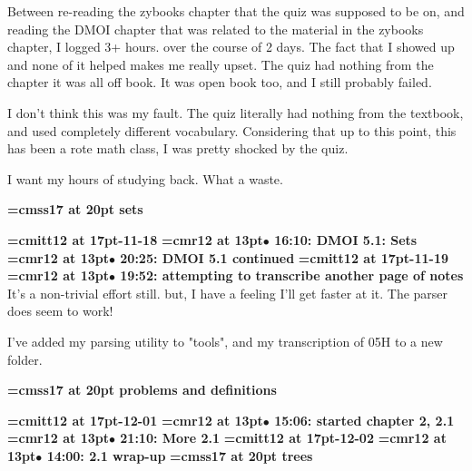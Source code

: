Between re-reading the zybooks chapter that the quiz was supposed to be on, and reading the DMOI chapter that was related to the material in the zybooks chapter, I logged 3+ hours. over the course of 2 days. The fact that I showed up and none of it helped makes me really upset. The quiz had nothing from the chapter it was all off book. It was open book too, and I still probably failed.
\par

I don't think this was my fault. The quiz literally had nothing from the textbook, and used completely different vocabulary. Considering that up to this point, this has been a rote math class, I was pretty shocked by the quiz.
\par

I want my hours of studying back. What a waste.
\par

{\medskip\noindent\bf\font\titlefont=cmss17 at 20pt sets}\medskip

{\medskip\noindent\bf\font\titlefont=cmitt12 at 17pt-11-18}\medskip
{\smallskip\noindent\bf\font\titlefont=cmr12 at 13pt\titlefont $\bullet$ 16:10: DMOI 5.1: Sets}\smallskip
{\smallskip\noindent\bf\font\titlefont=cmr12 at 13pt\titlefont $\bullet$ 20:25: DMOI 5.1 continued}\smallskip
{\medskip\noindent\bf\font\titlefont=cmitt12 at 17pt-11-19}\medskip
{\smallskip\noindent\bf\font\titlefont=cmr12 at 13pt\titlefont $\bullet$ 19:52: attempting to transcribe another page of notes}\smallskip
It's a non-trivial effort still. but, I have a feeling I'll get faster at it. The parser does seem to work!
\par

I've added my parsing utility to "tools", and my transcription of 05H to a new folder.
\par

{\medskip\noindent\bf\font\titlefont=cmss17 at 20pt problems and definitions}\medskip

{\medskip\noindent\bf\font\titlefont=cmitt12 at 17pt-12-01}\medskip
{\smallskip\noindent\bf\font\titlefont=cmr12 at 13pt\titlefont $\bullet$ 15:06: started chapter 2, 2.1}\smallskip
{\smallskip\noindent\bf\font\titlefont=cmr12 at 13pt\titlefont $\bullet$ 21:10: More 2.1}\smallskip
{\medskip\noindent\bf\font\titlefont=cmitt12 at 17pt-12-02}\medskip
{\smallskip\noindent\bf\font\titlefont=cmr12 at 13pt\titlefont $\bullet$ 14:00: 2.1 wrap-up}\smallskip
{}
{\medskip\noindent\bf\font\titlefont=cmss17 at 20pt trees}\medskip

